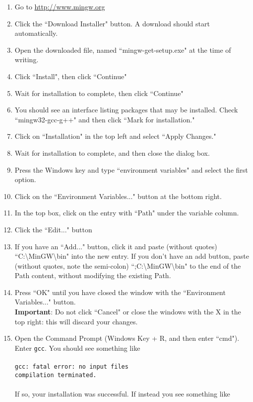 \documentclass{article}
\begin{document}
\begin{enumerate}
\item Go to \url{http://www.mingw.org}
\item Click the ``Download Installer" button. A download should start automatically.
\item Open the downloaded file, named ``mingw-get-setup.exe" at the time of writing.
\item Click ``Install", then click ``Continue"
\item Wait for installation to complete, then click ``Continue"
\item You should see an interface listing packages that may be installed. Check ``mingw32-gcc-g++" and then
click ``Mark for installation."
\item Click on ``Installation" in the top left and select ``Apply Changes."
\item Wait for installation to complete, and then close the dialog box.
\item Press the Windows key and type ``environment variables" and select the first option.
\item Click on the ``Environment Variables..." button at the bottom right.
\item In the top box, click on the entry with ``Path" under the variable column.
\item Click the ``Edit..." button
\item If you have an ``Add..." button, click it and paste (without quotes) ``C:\textbackslash MinGW\textbackslash bin" into the new entry.
If you don't have an add button, paste (without quotes, note the semi-colon) ``;C:\textbackslash MinGW\textbackslash bin" to the end of the
Path content, without modifying the existing Path.
\item Press ``OK" until you have closed the window with the ``Environment Variables..." button. \\
\textbf{Important}: Do not click ``Cancel" or close the windows with the X in the top right: this will discard your changes.
\item Open the Command Prompt (Windows Key + R, and then enter ``cmd"). Enter \verb|gcc|. You
should see something like \\ \\
\verb|gcc: fatal error: no input files| \\
\verb|compilation terminated.| \\ \\
If so, your installation was successful. If instead you see something like \\ \\

\end{enumerate}
\end{document}
